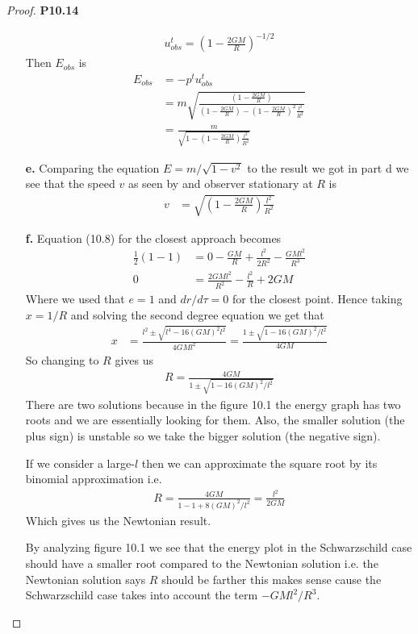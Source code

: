 \documentclass[11pt]{article}
\theoremstyle{definition}
\begin{document}
\begin{proof}{\textbf{P10.14}}
\begin{itemize}
    \begin{align*}
        u_{obs}^t = \left(1 - \frac{2GM}{R}\right)^{-1/2}
    \end{align*}
    Then $E_{obs}$ is 
    \begin{align*}
        E_{obs} &= -p^tu_{obs}^t \\
        &= m\sqrt{\frac{\left(1 - \frac{2GM}{R}\right)}{\left(1 - \frac{2GM}{R}\right)
        - \left(1 - \frac{2GM}{R}\right)^2\frac{l^2}{R^2}}}\\
        &= \frac{m}{\sqrt{1 - \left(1 - \frac{2GM}{R}\right)\frac{l^2}{R^2}}}
    \end{align*}
    \item [\textbf{e.}] Comparing the equation $E = m/\sqrt{1-v^2}$ to the result
    we got in part d we see that the speed $v$ as seen by and observer
    stationary at $R$ is
    \begin{align*}
        v &= \sqrt{\left(1 - \frac{2GM}{R}\right)\frac{l^2}{R^2}}
    \end{align*}
    \item [\textbf{f.}] Equation (10.8) for the closest approach becomes
    \begin{align*}
        \frac{1}{2}(1 -1) &= 0 - \frac{GM}{R} + \frac{l^2}{2R^2} - \frac{GMl^2}{R^3}\\
        0 &= \frac{2GMl^2}{R^2} - \frac{l^2}{R} + 2GM
    \end{align*}
    Where we used that $e = 1$ and $dr/d\tau = 0$ for the closest point. Hence
    taking $x = 1/R$ and solving the second degree equation we get that
    \begin{align*}
        x  &= \frac{l^2 \pm \sqrt{l^4 - 16(GM)^2l^2}}{4GMl^2}
        = \frac{1 \pm \sqrt{1 - 16(GM)^2/l^2}}{4GM}
    \end{align*}
    So changing to $R$ gives us
    \begin{align*}
        R = \frac{4GM}{1 \pm \sqrt{1 - 16(GM)^2/l^2}}
    \end{align*}
    There are two solutions because in the figure 10.1 the energy graph has two
    roots and we are essentially looking for them.
    Also, the smaller solution (the plus sign) is unstable so we take the bigger
    solution (the negative sign).
    
    If we consider a large-$l$ then we can approximate the square root by its
    binomial approximation i.e.
    \begin{align*}
        R = \frac{4GM}{1 - 1 + 8(GM)^2/l^2}
         = \frac{l^2}{2GM}
    \end{align*}
    Which gives us the Newtonian result.

    By analyzing figure 10.1 we see that the energy plot in the Schwarzschild
    case should have a smaller root compared to the Newtonian solution i.e.
    the Newtonian solution says $R$ should be farther this makes sense cause
    the Schwarzschild case takes into account the term $-GMl^2/R^3$.
\end{itemize}
\end{proof}
\end{document}
